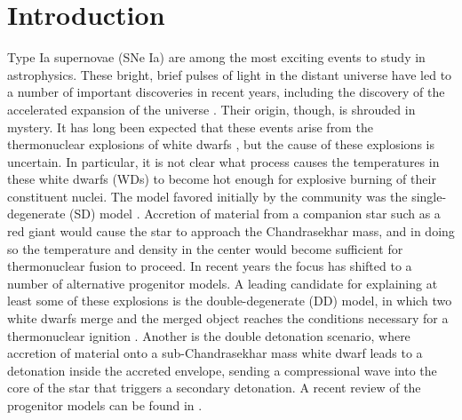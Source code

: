\documentclass[iop,numberedappendix]{../emulateapj}
\begin{document}

\section{Introduction}

Type Ia supernovae (SNe Ia) are among the most exciting
events to study in astrophysics. These bright, brief pulses of light
in the distant universe have led to a number of important discoveries
in recent years, including the discovery of the accelerated expansion
of the universe \citep{perlmutter1999,riess1998}. Their origin, though,
is shrouded in mystery. It has long been expected that these
events arise from the thermonuclear explosions of white dwarfs
\citep{hoyle_fowler:1960}, but the cause of these explosions is
uncertain. In particular, it is not clear what process causes the
temperatures in these white dwarfs (WDs) to become hot enough for explosive
burning of their constituent nuclei. The model favored initially by the
community was the single-degenerate (SD) model
\citep{whelan_iben:1973}. Accretion of material from a companion star
such as a red giant would cause the star to approach the Chandrasekhar
mass, and in doing so the temperature and density in the center would
become sufficient for thermonuclear fusion to proceed. In
recent years the focus has shifted to a number of alternative progenitor models. A
leading candidate for explaining at least some of these explosions is
the double-degenerate (DD) model, in which two white dwarfs merge and
the merged object reaches the conditions necessary for a thermonuclear
ignition \citep{ibentutukov:1984,webbink:1984}. Another is the double
detonation scenario, where accretion of material onto a
sub-Chandrasekhar mass white dwarf leads to a detonation inside the
accreted envelope, sending a compressional wave into the
core of the star that triggers a secondary detonation. A recent
review of the progenitor models can be found in
\citet{hillebrandt:2013}.
\end{document}
